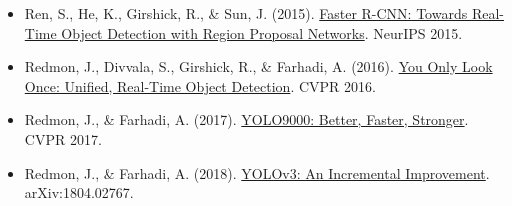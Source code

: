 \vspace{0.25em}
\begin{itemize}
\tightlist
\item
  Ren, S., He, K., Girshick, R., \& Sun, J. (2015). \href{https://proceedings.neurips.cc/paper/2015/hash/14bfa6bb14875e45bba028a21ed38046-Abstract.html}{Faster R-CNN: Towards Real-Time Object Detection with Region Proposal Networks}. NeurIPS 2015.
\item
  Redmon, J., Divvala, S., Girshick, R., \& Farhadi, A. (2016). \href{https://arxiv.org/abs/1506.02640}{You Only Look Once: Unified, Real-Time Object Detection}. CVPR 2016.
\item
  Redmon, J., \& Farhadi, A. (2017). \href{https://arxiv.org/abs/1612.08242}{YOLO9000: Better, Faster, Stronger}. CVPR 2017.
\item
  Redmon, J., \& Farhadi, A. (2018). \href{https://arxiv.org/abs/1804.02767}{YOLOv3: An Incremental Improvement}. arXiv:1804.02767.
\end{itemize}

\clearpage
